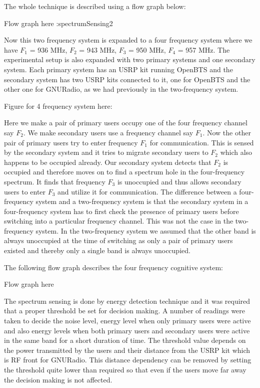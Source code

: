 The whole technique is described using a flow graph below:

Flow graph here :spectrumSensing2

Now this two frequency system is expanded to a 
four frequency system where we have $F_1$ = 936 MHz, 
$F_2$ = 943 MHz, $F_3$ = 950 MHz, $F_4$ = 957 MHz. The experimental setup
is also expanded with two primary systems and one secondary
system. Each primary system has an USRP kit running OpenBTS and
the secondary system has two USRP kits connected to it, one for OpenBTS
and the other one for GNURadio, as we had previously in the two-frequency 
system.
 
Figure for 4 frequency system here:


Here we make a pair of primary users occupy one of the four
frequency channel say $F_2$. We make secondary users use a frequency channel
say $F_1$. Now the other pair of primary users try to enter frequency
$F_1$ for communication. This is sensed by the secondary system 
and it tries to migrate secondary users to $F_2$ which also happens to be 
occupied already. Our secondary system detects that $F_2$ is occupied and
therefore moves on to find a spectrum hole in the four-frequency 
spectrum. It finds that frequency $F_3$ is unoccupied and thus
allows secondary users to enter $F_3$ and utilize it for communication.
The difference between a four-frequency system and a two-frequency system is 
that the secondary system in a four-frequency
system has to first check the presence of primary users before 
switching into a particular frequency channel.
This was not the case in the two-frequency system. In the
two-frequency system we assumed that the other band is always 
unoccupied at the time of switching as only a pair of primary
users existed and thereby only a single band is always unoccupied.


The following flow graph describes the four frequency cognitive system:

Flow graph here

The spectrum sensing is done by energy detection technique and
it was required that a proper threshold be set for decision making. 
A number of readings were taken to decide the noise level, energy 
level when only primary users were active and also energy levels 
when both primary users and secondary users were active in the same band 
for a short duration of time. The threshold value depends on the
power transmitted by the users and their distance from the USRP 
kit which is RF front for GNURadio. This distance dependency can 
be removed by setting the threshold quite lower than required so 
that even if the users move far away the decision making is not
affected. 






